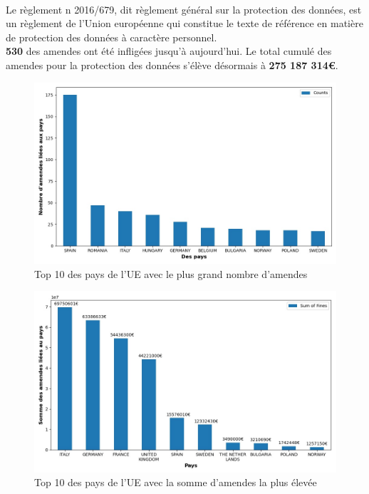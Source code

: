 \documentclass[french]{article}
\begin{document}

\noindent\HorRule{3pt} \\[-0.75\baselineskip]
\HorRule{1pt}

\vspace{0.5cm}
	\SepRule
\vspace{0.5cm}


\justify
Le règlement n 2016/679, dit règlement général sur la protection des données, est un règlement de l'Union européenne qui constitue le texte de référence en matière de protection des données à caractère personnel. \\
\textbf{530} des amendes ont été infligées jusqu'à aujourd'hui.
Le total cumulé des amendes pour la protection des données s'élève désormais à \textbf{275 187 314€}.


\begin{figure}
	[H]\centering\includegraphics[width=0.7\linewidth]{graphs/top10_countries}
      \caption{Top 10 des pays de l'UE avec le plus grand nombre d'amendes}
\end{figure}
\begin{figure}
	[H]\centering\includegraphics[width=0.7\linewidth]{graphs/top10_countries_fines}
	\caption{Top 10 des pays de l'UE avec la somme d'amendes la plus élevée}
 \end{figure}
\end{document}
